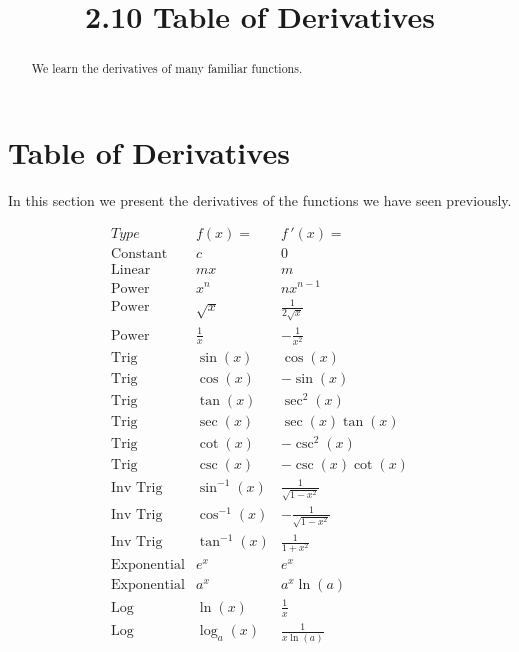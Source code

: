 \documentclass[handout]{ximera}
\title{2.10 Table of Derivatives}
\begin{document}
\begin{abstract}
We learn the derivatives of many familiar functions.
\end{abstract}

\maketitle


\section{Table of Derivatives}

In this section we present the derivatives of the functions we have seen previously.  

\begin{center}
\[
\begin{array}{c|c|c}
		Type & f(x)= & f\,'(x)=  \\
		\hline
		\text{Constant} & c & 0 \\[8pt]
		\text{Linear} & mx & m  \\[8pt]
		\text{Power} & x^n & nx^{n-1}  \\[8pt]
		\hline
		\text{Power} & \sqrt x & \displaystyle \frac{1}{2\sqrt x}\\[8pt]
		\text{Power} & \displaystyle \frac{1}{x} & -\displaystyle \frac{1}{x^2}\\[8pt]
	  \hline
		\text{Trig} & \sin(x) & \cos(x) \\[8pt]
		\text{Trig} & \cos(x) & -\sin(x) \\[8pt]
		\hline
		\text{Trig} & \tan(x) & \sec^2(x) \\[8pt]
		\text{Trig} & \sec(x) & \sec(x)\tan(x) \\[8pt]
		\hline
		\text{Trig} & \cot(x) & -\csc^2(x) \\[8pt]
		\text{Trig} & \csc(x) & -\csc(x)\cot(x) \\[8pt]
		\hline
		\text{Inv Trig} & \sin^{-1}(x) & \displaystyle{\frac{1}{\sqrt{1-x^2}}} \\[8pt]
		\text{Inv Trig} & \cos^{-1}(x) & \displaystyle{-\frac{1}{\sqrt{1-x^2}}} \\[8pt]
		\text{Inv Trig} & \tan^{-1}(x) & \displaystyle{\frac{1}{1+x^2}} \\[8pt]
		\hline
		\text{Exponential} & e^x & e^x \\[8pt]
		\text{Exponential} & a^x & a^x\ln(a) \\[8pt]
		\hline
		\text{Log} & \ln(x) & \displaystyle{\frac{1}{x}} \\[8pt]
		\text{Log} & \log_a(x) & \displaystyle{\frac{1}{x\ln(a)}}
	\end{array}
    \]
\end{center}
\end{document}
